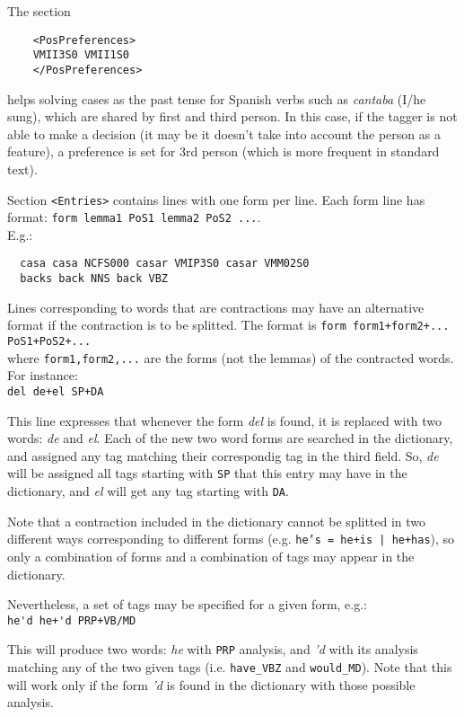 \documentclass[a4paper]{book}
\begin{document}
  The section
  \begin{verbatim}
    <PosPreferences>
    VMII3S0 VMII1S0
    </PosPreferences>
  \end{verbatim}
  helps solving cases as the past tense for Spanish verbs such as \textsl{cantaba} 
  (I/he sung), which are shared by first and third person. 
  In this case, if the tagger is not able to make a decision (it may be it doesn't 
  take into account the person as a feature), a preference is set for 3rd person 
  (which is more frequent in standard text).
  
  Section \verb#<Entries># contains lines with one form per line.  
  Each form line has format: {\tt form lemma1 PoS1 lemma2 PoS2 ...}.  \\
  E.g.:
  \begin{verbatim}
  casa casa NCFS000 casar VMIP3S0 casar VMM02S0
  backs back NNS back VBZ
  \end{verbatim}
  Lines corresponding to words that are contractions may have an
  alternative format if the contraction is to be splitted. The format
  is {\tt form form1+form2+... PoS1+PoS2+...}\\
  where {\tt form1,form2,...} are the forms (not the lemmas) of the contracted words.
  For instance:\\
  \verb#del de+el SP+DA#
  
  This line expresses that whenever the form {\sl del} is found, it is
  replaced with two words: {\sl de} and {\sl el}. Each of the new two
  word forms are searched in the dictionary, and assigned any tag
  matching their correspondig tag in the third field. So, {\sl de}
  will be assigned all tags starting with {\tt SP} that this
  entry may have in the dictionary, and {\sl el} will get any
  tag starting with {\tt DA}.
  
  Note that a contraction included in the dictionary cannot be 
  splitted in two different ways corresponding to different 
  forms (e.g. {\tt he's = he+is | he+has}),
  so only a combination of forms and a combination of tags may appear
  in the dictionary.

   Nevertheless, a set of tags may be specified for a given form, e.g.:\\
  \verb#he'd he+'d PRP+VB/MD#

   This will produce two words: {\sl he} with {\tt PRP} analysis, and
   {\sl 'd} with its analysis matching any of the two given tags
   (i.e. {\tt have\_VBZ} and {\tt would\_MD}).  Note that this will
   work only if the form {\sl 'd} is found in the dictionary with
   those possible analysis.
\end{document}
